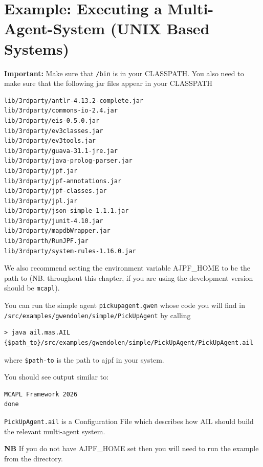 \section{Example: Executing a Multi-Agent-System (UNIX Based Systems)}
{\bf Important:} Make sure that \texttt{\ajpfversion/bin} is in your CLASSPATH.  You also need to make sure that the following jar files appear in your CLASSPATH

\begin{verbatim}
lib/3rdparty/antlr-4.13.2-complete.jar
lib/3rdparty/commons-io-2.4.jar
lib/3rdparty/eis-0.5.0.jar
lib/3rdparty/ev3classes.jar
lib/3rdparty/ev3tools.jar
lib/3rdparty/guava-31.1-jre.jar
lib/3rdparty/java-prolog-parser.jar
lib/3rdparty/jpf.jar
lib/3rdparty/jpf-annotations.jar
lib/3rdparty/jpf-classes.jar
lib/3rdparty/jpl.jar
lib/3rdparty/json-simple-1.1.1.jar
lib/3rdparty/junit-4.10.jar
lib/3rdparty/mapdbWrapper.jar
lib/3rdparth/RunJPF.jar
lib/3rdparty/system-rules-1.16.0.jar
\end{verbatim}

We also recommend setting the environment variable AJPF\_HOME to be the path to \texttt{\ajpfversion} (NB. throughout this chapter, if you are using the development version \texttt{\ajpfversion} should be \texttt{mcapl}).

You can run the simple agent \texttt{pickupagent.gwen} whose code you will find in \texttt{/src/examples/gwendolen/simple/PickUpAgent} by calling

\noindent \begin{lstlisting}[basicstyle=\tiny]
> java ail.mas.AIL {$path_to}/src/examples/gwendolen/simple/PickUpAgent/PickUpAgent.ail
\end{lstlisting}
\medskip

\noindent where \texttt{\${path-to}} is the path to ajpf in your system.

You should see output similar to:

\noindent \begin{lstlisting}
MCAPL Framework 2026
done
\end{lstlisting}
\medskip
 
\texttt{PickUpAgent.ail} is a Configuration File which describes how AIL should build the relevant multi-agent system.

{\bf NB}  If you do not have AJPF\_HOME set then you will need to run the example from the \texttt{\ajpfversion} directory.

